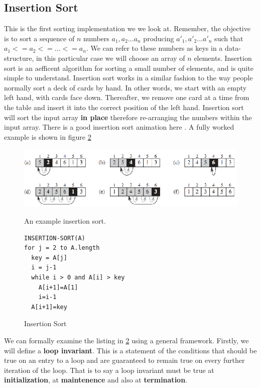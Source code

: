 \documentclass[10pt,a4paper]{article}
\begin{document}
\subsection{Insertion Sort}
This is the first sorting implementation we we look at. Remember, the objective is to sort a sequence of $n$ numbers $a_1,a_2...a_n$ producing $a'_1,a'_2...a'_n$ such that $a_1 <= a_2 <= ... <= a_n$. We can refer to these numbers as keys in a data-structure, in this particular case we will choose an array of $n$ elements. Insertion sort is an aefficent algorithm for sorting a small number of elements, and is quite simple to understand. 
\newline\newline
Insertion sort works in a similar fashion to the way people normally sort a deck of cards by hand. In other words, we start with an empty left hand, with cards face down. Thereafter, we remove one card at a time from the table and insert it into the correct position of the left hand. Insertion sort will sort the input array {\bf in place} therefore re-arranging the numbers within the input array. There is a good insertion sort animation here \cite{INSANIM}. A fully worked example is shown in figure \ref{insertionlisting}
\begin{figure}
\caption{An example insertion sort.\cite{OSCONCEPTS}}
\begin{center}
\includegraphics[scale=0.5]{../images/insertion.png}
\label{insertion}
\end{center}
\end{figure}
\begin{figure}
\caption{Insertion Sort}
\begin{center}
\begin{lstlisting}
INSERTION-SORT(A)
for j = 2 to A.length
  key = A[j]
  i = j-1
  while i > 0 and A[i] > key
    A[i+1]=A[1]
    i=i-1
  A[i+1]=key
\end{lstlisting}
\label{insertionlisting}
\end{center}
\end{figure}
We can formally examine the listing in \ref{insertionlisting} using a general framework. Firstly, we will define a {\bf loop invariant}. This is a statement of the conditions that should be true on an entry to a loop and are guaranteed to remain true on every further iteration of the loop. That is to say a loop invariant must be true at {\bf initialization}, at {\bf maintenence} and also at {\bf termination}.
\end{document}
